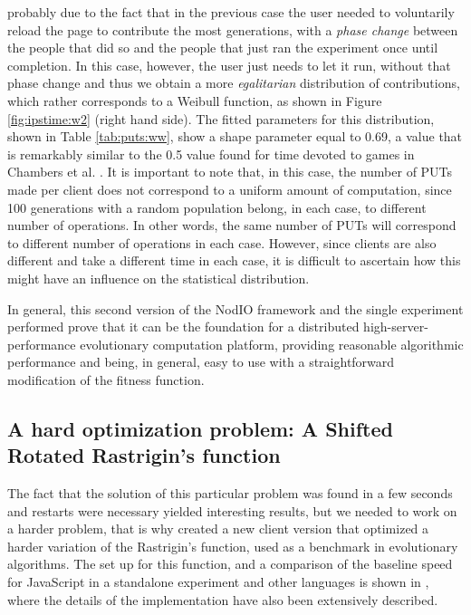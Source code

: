 \documentclass{sig-alternate}
\begin{document}
probably due to the fact that in the previous case the user needed to
voluntarily reload the page to contribute the most generations, with a
{\em phase change} between the people that did so and the people that
just ran the experiment once until completion. In this case, however, the
user just needs to let it run, without that phase change and thus we obtain a
more {\em egalitarian} distribution of contributions, which rather
corresponds to a Weibull function, as shown in Figure
\ref{fig:ipstime:w2} (right hand side). The fitted parameters for this
distribution, shown in Table \ref{tab:puts:ww}, show a shape parameter
equal to 0.69, a value that is remarkably similar to the 0.5 value
found for time devoted to games in Chambers et
al. \cite{chambers2005measurement}. It is important to note that, in
this case, the number of PUTs made per client does not correspond to a
uniform amount of computation, since 100 generations with a random
population belong, in each case, to different number of
operations. In other words, the same number of PUTs will correspond to
different number of operations in each case. However, since clients
are also different and take a different time in each case, it is
difficult to ascertain how this might have an influence on the
statistical distribution.

In general, this second version of the {\sf NodIO} framework and the
single experiment performed prove that it can be the foundation for a distributed
high-server-performance evolutionary computation platform,
providing reasonable algorithmic performance and being, in general,
easy to use with a straightforward modification of the fitness
function. 

\subsection{A hard optimization problem: A Shifted Rotated Rastrigin's function}
\label{sec:rastrigin}


The fact that the solution of this particular problem was found in a
few seconds and restarts were necessary yielded interesting results, %
but we needed to work on a harder problem, that is why created a new
client version that optimized a harder variation of the Rastrigin's function, 
used as a benchmark in evolutionary
algorithms. The set up for this function, and a comparison of the
baseline speed for JavaScript in a standalone experiment and other
languages is shown in \cite{2016arXiv160101607Manom}, where the details of
the implementation have also been extensively described. 
\end{document}
